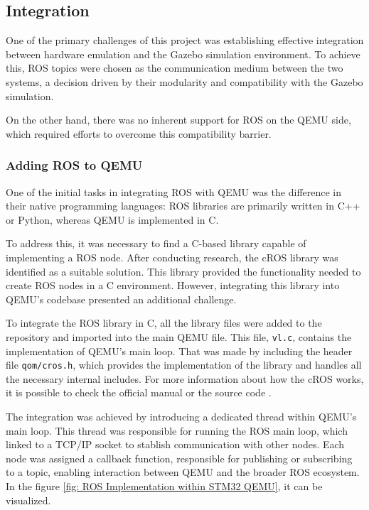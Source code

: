 \documentclass[../../monografia.tex]{subfiles}
\begin{document}
\subsection{Integration}

One of the primary challenges of this project was establishing effective integration between hardware emulation and the Gazebo simulation environment. To achieve this, ROS topics were chosen as the communication medium between the two systems, a decision driven by their modularity and compatibility with the Gazebo simulation.

On the other hand, there was no inherent support for ROS on the QEMU side, which required efforts to overcome this compatibility barrier.

\subsubsection{Adding ROS to QEMU}

One of the initial tasks in integrating ROS with QEMU was the difference in their native programming languages: ROS libraries are primarily written in C++ or Python, whereas QEMU is implemented in C.

To address this, it was necessary to find a C-based library capable of implementing a ROS node. After conducting research, the cROS library \cite{CROS_23} was identified as a suitable solution. This library provided the functionality needed to create ROS nodes in a C environment. However, integrating this library into QEMU's codebase presented an additional challenge.

To integrate the ROS library in C, all the library files were added to the repository and imported into the main QEMU file. This file, \texttt{vl.c}, contains the implementation of QEMU's main loop. That was made by including the header file \texttt{qom/cros.h}, which provides the implementation of the library and handles all the necessary internal includes. For more information about how the cROS works, it is possible to check the official manual \cite{cros_manual_24} or the source code \cite{CROS_23}.

The integration was achieved by introducing a dedicated thread within QEMU's main loop. This thread was responsible for running the ROS main loop, which linked to a TCP/IP socket to stablish communication with other nodes. Each node was assigned a callback function, responsible for publishing or subscribing to a topic, enabling interaction between QEMU and the broader ROS ecosystem. In the figure \ref{fig: ROS Implementation within STM32 QEMU}, it can be visualized.
\end{document}
